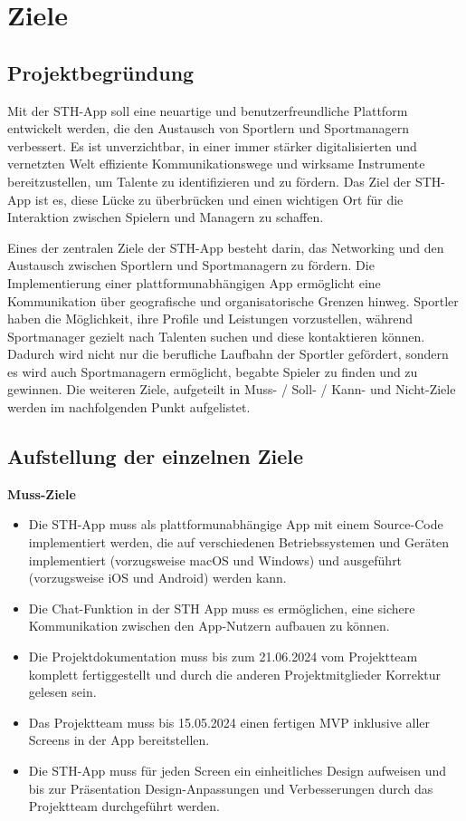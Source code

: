 \chapter{Ziele}
\section{Projektbegründung}
Mit der STH-App soll eine neuartige und benutzerfreundliche Plattform entwickelt werden, die den Austausch von Sportlern und Sportmanagern verbessert.
Es ist unverzichtbar, in einer immer stärker digitalisierten und vernetzten Welt effiziente Kommunikationswege und wirksame Instrumente bereitzustellen, um Talente zu identifizieren und zu fördern.
Das Ziel der STH-App ist es, diese Lücke zu überbrücken und einen wichtigen Ort für die Interaktion zwischen Spielern und Managern zu schaffen.

\noindent
Eines der zentralen Ziele der STH-App besteht darin, das Networking und den Austausch zwischen Sportlern und Sportmanagern zu fördern.
Die Implementierung einer plattformunabhängigen App ermöglicht eine Kommunikation über geografische und organisatorische Grenzen hinweg.
Sportler haben die Möglichkeit, ihre Profile und Leistungen vorzustellen, während Sportmanager gezielt nach Talenten suchen und diese kontaktieren können.
Dadurch wird nicht nur die berufliche Laufbahn der Sportler gefördert, sondern es wird auch Sportmanagern ermöglicht, begabte Spieler zu finden und zu gewinnen.
\newline
Die weiteren Ziele, aufgeteilt in Muss- / Soll- / Kann- und Nicht-Ziele werden im nachfolgenden Punkt aufgelistet.

\section{Aufstellung der einzelnen Ziele}
\textbf{Muss-Ziele}
\begin{itemize}
    \item Die STH-App muss als plattformunabhängige App mit einem Source-Code implementiert werden, die auf verschiedenen Betriebssystemen und Geräten implementiert (vorzugsweise macOS und Windows) und ausgeführt (vorzugsweise iOS und Android) werden kann.
    \item Die Chat-Funktion in der STH App muss es ermöglichen, eine sichere Kommunikation zwischen den App-Nutzern aufbauen zu können.
    \item Die Projektdokumentation muss bis zum 21.06.2024 vom Projektteam komplett fertiggestellt und durch die anderen Projektmitglieder Korrektur gelesen sein.
    \item Das Projektteam muss bis 15.05.2024 einen fertigen MVP inklusive aller Screens in der App bereitstellen.
    \item Die STH-App muss für jeden Screen ein einheitliches Design aufweisen und bis zur Präsentation Design-Anpassungen und Verbesserungen durch das Projektteam durchgeführt werden.
\end{itemize}


